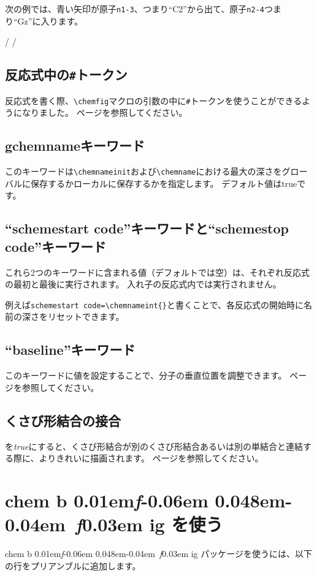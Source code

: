 \documentclass[10pt]{ltjsarticle}
\makeatletter
\newcommand\make@car@active[1]{%
	\catcode`#1\active
	\begingroup
		\lccode`\~`#1\relax
		\lowercase{\endgroup\def~}%
}
\newif\if@exstar
\newcommand\exemple{%
	\begingroup
	\parskip\smallskipamount
	\@makeother\;\@makeother\!\@makeother\?\@makeother\:%
	\@ifstar{\@exstartrue\exemple@}{\@exstarfalse\exemple@}}
\newcommand\exemple@[2][65]{%
	\medbreak\noindent
	\begingroup
		\let\do\@makeother\dospecials
		\make@car@active\ { {}}%
		\make@car@active\^^M{\par\leavevmode}%
		\make@car@active\^^I{\space\space}%
		\make@car@active\,{\leavevmode\kern\z@\string,}%
		\make@car@active\-{\leavevmode\kern\z@\string-}%
		\make@car@active\>{\leavevmode\kern\z@\string>}%
		\make@car@active\<{\leavevmode\kern\z@\string<}%
		\exemple@@{#1}{#2}%
}
\newcommand\exemple@@[3]{%
	\def\@tempa##1#3{\exemple@@@{#1}{#2}{##1}}%
	\@tempa
}
\newcommand\exemple@@@[3]{%
	\xdef\the@code{#3}%
	\endgroup
	\if@exstar
		\begingroup
			\fboxrule0.4pt
			\let\breakboxparindent\z@
			\def\bkvz@bottom{\hrule\@height\fboxrule}%
			\let\bkvz@before@breakbox\relax
			\def\bkvz@set@linewidth{\advance\linewidth\dimexpr-2\fboxrule-2\fboxsep}%
			\def\bkvz@left{\vrule\@width\fboxrule\hskip\fboxsep}%
			\def\bkvz@right{\hskip\fboxsep\vrule\@width\fboxrule}%
			\def\bkvz@top{\hbox to \hsize{%
				\vrule\@width\fboxrule\@height\fboxrule
				\leaders\bkvz@bottom\hfill
				\sffamily
				\fboxsep\z@
				\colorbox{black}{\kern0.25em\color{white}\footnotesize\lower0.5ex\hbox{\strut#2}\kern0.25em}%
				\leaders\bkvz@bottom\hfill
				\vrule\@width\fboxrule\@height\fboxrule}}%
			\breakbox
				\kern.5ex\relax
				\ltjsetparameter{autoxspacing=false, autospacing=false}
				\ttfamily\footnotesize\the@code\par
				\normalfont
				\kern3pt
				\hrule height0.1pt width\linewidth depth0.1pt
				\vskip5pt
				\rightskip0pt plus 1fill
				\everypar{{\color{lightgray}\rlap{\vrule height0.1pt width\linewidth depth0.1pt}}\hskip0pt plus 1fill}%
				\newlinechar`\^^M\everyeof{\noexpand}\scantokens{#3}\par
			\endbreakbox
		\endgroup
	\else
		\vskip0.5ex
		\boxput*(0,1)
			{\fboxsep\z@
			\hbox{\sffamily\colorbox{black}{\leavevmode\kern0.25em{\color{white}\footnotesize\strut#2}\kern0.25em}}%
			}%
			{\fboxsep5pt
			\fbox{%
				$\vcenter{\hsize\dimexpr0.#1\linewidth-\fboxsep-\fboxrule\relax
					\kern5pt\parskip0pt%
                                        \ltjsetparameter{autoxspacing=false, autospacing=false}%
                                        \ttfamily\footnotesize\the@code}%
				\vcenter{\kern5pt\hsize\dimexpr\linewidth-0.#1\linewidth-\fboxsep-\fboxrule\relax
					\everypar{{\color{lightgray}\rlap{\vrule height0.1pt width\dimexpr\linewidth-0.#1\linewidth-\fboxsep-\fboxrule depth0.1pt}}}%
					\footnotesize\newlinechar`\^^M\everyeof{\noexpand}\scantokens{#3}}$%
				}%
			}%
	\fi
	\medbreak
	\endgroup
}
\DeclareRobustCommand\CF{%
  \texorpdfstring{%
	\textsf{%
		chem%
		\if\string b\detokenize\expandafter{\f@series}%
			\lower0.01em\hbox{\itshape f}\kern-0.06em
		\else
			\lower0.048em\hbox{\kern-0.04em \itshape f}\kern0.03em
		\fi ig%
		}%
		\xspace}{chemfig}}
\newcommand*\CFkey[1]{{\color{teal}\texttt{\detokenize{#1}}}}
\newcommand*\CFval[1]{{\color{teal}\textlangle\textit{#1}\textrangle}}
\makeatother
\begin{document}
次の例では、青い矢印が原子\verb|n1-3|、つまり``C2''から出て、原子\verb|n2-4|つまり``Gz''に入ります。

\exemple{ノード名}/
/

\subsection{反応式中の\texttt\#{}トークン}
反応式を書く際、\verb|\chemfig|マクロの引数の中に\verb|#|トークンを使うことができるようになりました。
\pageref{modif.retrait}ページを参照してください。

\subsection{gchemnameキーワード}

このキーワードは\verb|\chemnameinit|および\verb|\chemname|における最大の深さをグローバルに保存するかローカルに保存するかを指定します。
デフォルト値はtrueです。

\subsection{``schemestart code''キーワードと``schemestop code''キーワード}

これら2つのキーワードに含まれる値（デフォルトでは空）は、それぞれ反応式の最初と最後に実行されます。
入れ子の反応式内では実行されません。

例えば\verb|schemestart code=\chemnameint{}|と書くことで、各反応式の開始時に名前の深さをリセットできます。

\subsection{``baseline''キーワード}

このキーワードに値を設定することで、分子の垂直位置を調整できます。
\pageref{baseline}ページを参照してください。

\subsection{くさび形結合の接合}
\CFkey{bond join}を\CFval{true}にすると、くさび形結合が別のくさび形結合あるいは別の単結合と連結する際に、よりきれいに描画されます。
\pageref{joinCram}ページを参照してください。

\section{\protect\CF{}を使う}
\CF{}パッケージを使うには、以下の行をプリアンブルに追加します。
\end{document}
